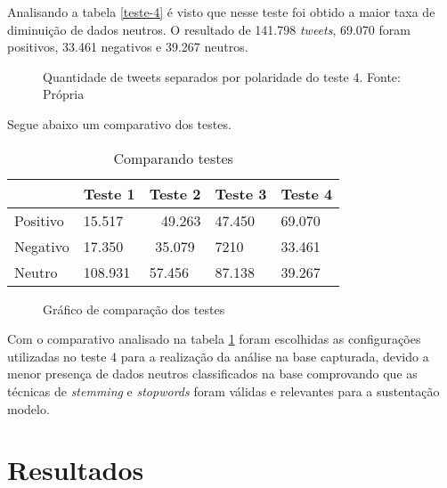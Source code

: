 Analisando a tabela \ref{teste-4} é visto que nesse teste foi obtido a maior taxa de diminuição de dados neutros. O resultado de 141.798 \textit{tweets}, 69.070 foram positivos, 33.461 negativos e 39.267 neutros.


\begin{figure}[H]
	\centering{}
	\caption{Quantidade de tweets separados por polaridade do teste 4. Fonte: Própria}
	\label{teste-graf-4}
\end{figure}

Segue abaixo um comparativo dos testes.

\begin{table}[H]		
	\centering
	\caption{Comparando testes}
	\label{teste-comp}
	\begin{tabular}{l|l|c|l|l|}
		\cline{2-5}
		\multicolumn{1}{c|}{} & \multicolumn{1}{c|}{Teste 1} & Teste 2 & \multicolumn{1}{c|}{Teste 3} & \multicolumn{1}{c|}{Teste 4} \\ \hline
		\multicolumn{1}{|l|}{Positivo} & 15.517 & \multicolumn{1}{r|}{49.263} & 47.450 & 69.070 \\ \hline
		\multicolumn{1}{|l|}{Negativo} & 17.350 & 35.079 & 7210 & 33.461 \\ \hline
		\multicolumn{1}{|l|}{Neutro} & 108.931 & \multicolumn{1}{l|}{57.456} & 87.138 & 39.267 \\ \hline
	
	\end{tabular}
\end{table}

\begin{figure}[H]
	\centering{}
	\caption{Gráfico de comparação dos testes}
	\label{teste-graf-comp}
\end{figure}


Com o comparativo analisado na tabela \ref{teste-comp} foram escolhidas as configurações utilizadas no teste 4 para a realização da análise na base capturada, devido a menor presença de dados neutros classificados na base comprovando que as técnicas de \textit{stemming} e \textit{stopwords} foram válidas e relevantes para a sustentação modelo.

\section{Resultados}\label{result}

